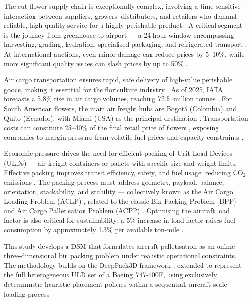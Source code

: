\documentclass[12pt,a4paper]{article}
\begin{document}
The cut flower supply chain is exceptionally complex, involving a
time-sensitive interaction between suppliers, growers, distributors, and
retailers who demand reliable, high-quality service for a highly
perishable product \citep{Paiva2024}.
A critical segment is the journey from greenhouse to airport --- a
24-hour window encompassing harvesting, grading, hydration, specialised
packaging, and refrigerated transport \citep{Sirisaranlak2017}.
At international auctions, even minor damage can reduce prices by
5--10\%, while more significant quality issues can slash prices by up
to 50\% \citep{Sirisaranlak2017}.

Air cargo transportation ensures rapid, safe delivery of high-value
perishable goods, making it essential for the floriculture industry
\citep{Hava2022}.
As of 2025, IATA forecasts a 5.8\% rise in air cargo volumes, reaching
72.5~million tonnes \citep{IATA2025}.
For South American flowers, the main air freight hubs are Bogot\'{a}
(Colombia) and Quito (Ecuador), with Miami (USA) as the principal
destination \citep{Fioravanti2022}.
Transportation costs can constitute 25--40\% of the final retail price
of flowers \citep{Button2020,Vega2008}, exposing companies to margin
pressure from volatile fuel prices and capacity constraints
\citep{Bonetti2022}.

Economic pressure drives the need for efficient packing of Unit Load
Devices (ULDs) --- air freight containers or pallets with specific size
and weight limits.
Effective packing improves transit efficiency, safety, and fuel usage,
reducing CO$_2$ emissions \citep{Zhao2023}.
The packing process must address geometry, payload, balance,
orientation, stackability, and stability --- collectively known as the
Air Cargo Loading Problem (ACLP) \citep{Chan2006a}, related to the
classic Bin Packing Problem (BPP) and Air Cargo Palletisation Problem
(ACPP) \citep{Paquay2018}.
Optimising the aircraft load factor is also critical for
sustainability: a 5\% increase in load factor raises fuel consumption
by approximately 1.3\% per available ton-mile
\citep{Brueckner2017,Queiroz2024}.

This study develops a DSM that formulates aircraft palletisation as an
online three-dimensional bin packing problem under realistic operational
constraints.
The methodology builds on the DeepPack3D framework \citep{Tsang2025},
extended to represent the full heterogeneous ULD set of a
Boeing~747-400F, using exclusively deterministic heuristic placement
policies within a sequential, aircraft-scale loading process.
\end{document}
